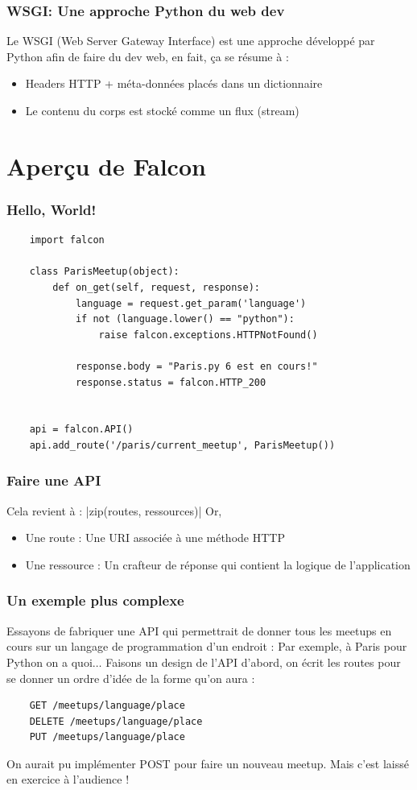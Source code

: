 \documentclass[10pt, compress]{beamer}
\begin{document}
\begin{frame}[fragile]
	\frametitle{WSGI: Une approche Python du web dev}
    
    Le WSGI (Web Server Gateway Interface) est une approche développé par Python afin de faire du dev web, en fait, ça se résume à :
    \pause
    \begin{itemize}[<+->]
    	\item Headers HTTP + méta-données placés dans un dictionnaire
        \item Le contenu du corps est stocké comme un flux (stream)
    \end{itemize}
\end{frame}
\section{Aperçu de Falcon}
\begin{frame}[fragile]
	\frametitle{Hello, World!}
    \begin{verbatim}
    import falcon
    
    class ParisMeetup(object):
        def on_get(self, request, response):
            language = request.get_param('language')
            if not (language.lower() == "python"):
                raise falcon.exceptions.HTTPNotFound()
            
            response.body = "Paris.py 6 est en cours!"
            response.status = falcon.HTTP_200
                
    
    api = falcon.API()
    api.add_route('/paris/current_meetup', ParisMeetup())
    \end{verbatim}
\end{frame}
\begin{frame}[fragile]
	\frametitle{Faire une API}
    \pause
    Cela revient à : |zip(routes, ressources)|
    Or,
    \pause
    \begin{itemize}[<+->]
    	\item Une route : Une URI associée à une méthode HTTP
        \item Une ressource : Un \og{} crafteur \fg{} de réponse qui contient la logique de l'application
    \end{itemize}
\end{frame}
\begin{frame}[fragile]
	\frametitle{Un exemple plus complexe}
    
    Essayons de fabriquer une API qui permettrait de donner tous les meetups en cours sur un langage de programmation d'un endroit :
    \pause
    Par exemple, à Paris pour Python on a quoi$\ldots$
    \pause
    Faisons un design de l'API d'abord, on écrit les routes pour se donner un ordre d'idée de la forme qu'on aura :
    \pause
    \begin{verbatim}
    GET /meetups/language/place
    DELETE /meetups/language/place
    PUT /meetups/language/place
    \end{verbatim}
    \pause
    On aurait pu implémenter POST pour faire un nouveau meetup. Mais c'est laissé en exercice à l'audience !
\end{frame}
\end{document}
